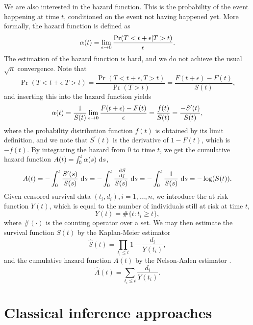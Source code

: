We are also interested in the hazard function. This is the probability of the event happening at time $t$, conditioned on the event not having happened yet. More formally, the hazard function is defined as
\begin{equation*}
    \alpha(t)=\lim_{\epsilon\to0}\frac{\Pr(T<t+\epsilon|T>t)}{\epsilon}.
\end{equation*}
The estimation of the hazard function is hard, and we do not achieve the usual $\sqrt{n}$ convergence. 
Note that
\begin{equation*}
    \Pr(T<t+\epsilon|T>t)=\frac{\Pr(T<t+\epsilon,T>t)}{\Pr(T>t)}=\frac{F(t+\epsilon)-F(t)}{S(t)},
\end{equation*}
and inserting this into the hazard function yields
\begin{equation}
\label{eq:hfs}
    \alpha(t)=\frac{1}{S(t)}\lim_{\epsilon\to0}\frac{F(t+\epsilon)-F(t)}{\epsilon}=\frac{f(t)}{S(t)}=\frac{-S^\prime(t)}{S(t)},
\end{equation}
where the probability distribution function $f(t)$ is obtained by its limit definition, and we note that $S^\prime(t)$ is the derivative of $1-F(t)$, which is $-f(t)$. By integrating the hazard from 0 to time $t$, we get the cumulative hazard function $A(t)=\int_0^t\alpha(s)~\text{d} s$,
\begin{equation}\label{eq:cumulative-hazard}
    A(t)=-\int_0^t\frac{S^\prime(s)}{S(s)}~\text{d} s=-\int_0^t\frac{\frac{~\text{d} S}{~\text{d} f}}{S(s)}~\text{d} s=-\int_0^t\frac{1}{S(s)}~\text{d} s=-\log(S(t)).
\end{equation}
Given censored survival data $(t_i,d_i),i=1,\ldots,n$, we introduce the at-risk function $Y(t)$, which is equal to the number of individuals still at risk at time $t$,
\begin{equation*}
    Y(t)=\#\{t\colon t_i\geq t\},
\end{equation*}
where $\#(\cdot)$ is the counting operator over a set. We may then estimate the survival function $S(t)$ by the Kaplan-Meier estimator \citep{kaplan-meier}
\begin{equation*}
    \hat{S}(t)=\prod_{t_i\leq t}1-\frac{d_i}{Y(t_i)},
\end{equation*}
and the cumulative hazard function $A(t)$ by the Nelson-Aalen estimator \citep{nelson, aalen1978}.
\begin{equation*}
    \hat{A}(t)=\sum_{t_i\leq t}\frac{d_i}{Y(t_i)}.
\end{equation*}

\section{Classical inference approaches}
